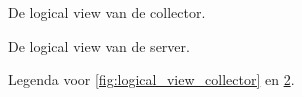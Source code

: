 \documentclass[../views.tex]{subfiles}
\begin{document}
\begin{figure}[ht]
  \centering
  \caption{De logical view van de collector.}
  \label{fig:logical_view_collector}
\end{figure}

\begin{figure}[ht]
  \centering
  \caption{De logical view van de server.}
  \label{fig:logical_view_server}
\end{figure}

\begin{figure}[ht]
  \centering
  \caption{Legenda voor \autoref{fig:logical_view_collector} en \ref{fig:logical_view_server}.}
\end{figure}
\end{document}

